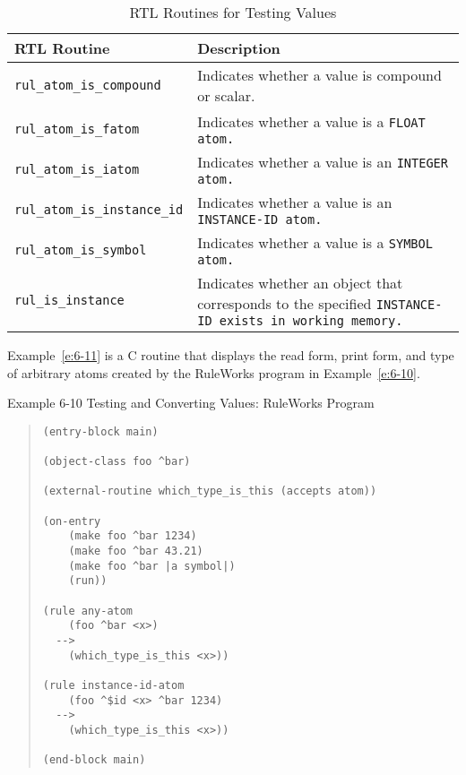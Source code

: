\begin{table}[h]
  \begin{tabularx}{\columnwidth}{lX}
    \toprule
    RTL Routine &  Description \\
    \midrule
    \verb|rul_atom_is_compound| & Indicates whether a value is compound or 
                                  scalar. \\
    \verb|rul_atom_is_fatom| & Indicates whether a value is a \tt{FLOAT} atom. \\
    \verb|rul_atom_is_iatom| & Indicates whether a value is an \tt{INTEGER} atom. \\
    \verb|rul_atom_is_instance_id| & Indicates whether a value is an \tt{INSTANCE-ID}
                                     atom. \\
    \verb|rul_atom_is_symbol| & Indicates whether a value is a \tt{SYMBOL} atom. \\
    \verb|rul_is_instance| & Indicates whether an object that corresponds to
                             the specified \tt{INSTANCE-ID} exists in working    
                             memory. \\
    \bottomrule
  \end{tabularx}
  \caption{RTL Routines for Testing Values}
  \label{t:6-8}
\end{table}

Example~\ref{e:6-11} is a C routine that displays the read form, print
form, and type of arbitrary atoms created by the RuleWorks program in
Example~\ref{e:6-10}.


Example 6-10 Testing and Converting Values: RuleWorks Program
\begin{quote}
\begin{verbatim}
(entry-block main)

(object-class foo ^bar)

(external-routine which_type_is_this (accepts atom))

(on-entry
    (make foo ^bar 1234)
    (make foo ^bar 43.21)
    (make foo ^bar |a symbol|)
    (run))

(rule any-atom
    (foo ^bar <x>)
  -->
    (which_type_is_this <x>))

(rule instance-id-atom
    (foo ^$id <x> ^bar 1234)
  -->
    (which_type_is_this <x>))

(end-block main)
\end{verbatim}
\end{quote}

